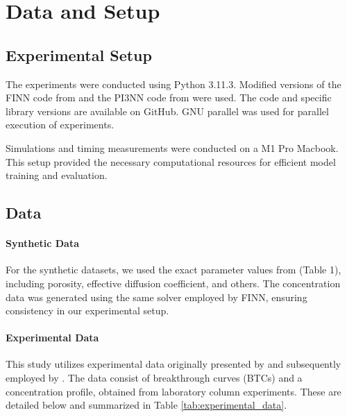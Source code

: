 \section{Data and Setup}

\subsection{Experimental Setup}
The experiments were conducted using Python 3.11.3. Modified versions of the FINN code from \cite{finn} and the PI3NN code from \cite{pi3nn} were used. The code and specific library versions are available on GitHub. GNU parallel \cite{tange_2023_10199085} was used for parallel execution of experiments. %

Simulations and timing measurements were conducted on a M1 Pro Macbook. This setup provided the necessary computational resources for efficient model training and evaluation.


\subsection{Data}
\paragraph{Synthetic Data}
For the synthetic datasets, we used the exact parameter values from \cite{finn} (Table 1), including porosity, effective diffusion coefficient, and others. The concentration data was generated using the same solver employed by FINN, ensuring consistency in our experimental setup.


\paragraph{Experimental Data}
\label{sec:experimental_data}

This study utilizes experimental data originally presented by \cite{nowak2016entropy} and subsequently employed by \cite{finn}. The data consist of breakthrough curves (BTCs) and a concentration profile, obtained from laboratory column experiments. These are detailed below and summarized in Table \vref{tab:experimental_data}.

